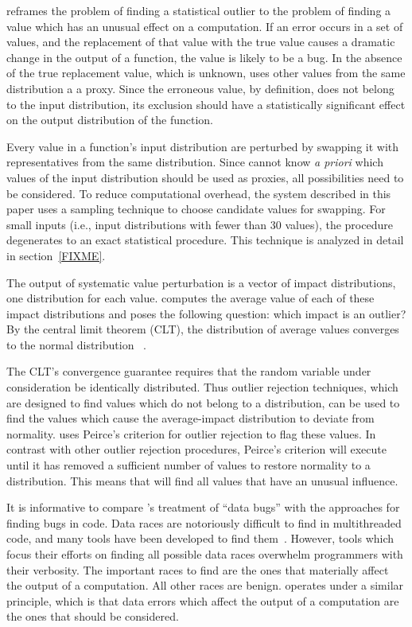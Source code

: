 \checkcell{} reframes the problem of finding a statistical outlier to the problem of finding a value which has an unusual effect on a computation.  If an error occurs in a set of values, and the replacement of that value with the true value causes a dramatic change in the output of a function, the value is likely to be a bug.  In the absence of the true replacement value, which is unknown, \checkcell{} uses other values from the same distribution a a proxy.  Since the erroneous value, by definition, does not belong to the input distribution, its exclusion should have a statistically significant effect on the output distribution of the function.

Every value in a function's input distribution are perturbed by swapping it with representatives from the same distribution.  Since \checkcell{} cannot know \emph{a priori} which values of the input distribution should be used as proxies, all possibilities need to be considered.  To reduce computational overhead, the system described in this paper uses a sampling technique to choose candidate values for swapping.  For small inputs (i.e., input distributions with fewer than 30 values), the procedure degenerates to an exact statistical procedure.  This technique is analyzed in detail in section~\ref{FIXME}.

The output of systematic value perturbation is a vector of impact distributions, one distribution for each value.  \checkcell{} computes the average value of each of these impact distributions and poses the following question: which impact is an outlier?  By the central limit theorem (CLT), the distribution of average values converges to the normal distribution ~\cite{FIXME}.

The CLT's convergence guarantee requires that the random variable under consideration be identically distributed.  Thus outlier rejection techniques, which are designed to find values which do not belong to a distribution, can be used to find the values which cause the average-impact distribution to deviate from normality.  \checkcell{} uses Peirce's criterion for outlier rejection to flag these values.  In contrast with other outlier rejection procedures, Peirce's criterion will execute until it has removed a sufficient number of values to restore normality to a distribution.  This means that \checkcell{} will find all values that have an unusual influence.

It is informative to compare \checkcell{}'s treatment of ``data bugs'' with the approaches for finding bugs in code.  Data races are notoriously difficult to find in multithreaded code, and many tools have been developed to find them~\cite{FIXME}.  However, tools which focus their efforts on finding all possible data races overwhelm programmers with their verbosity.  The important races to find are the ones that materially affect the output of a computation.  All other races are benign.  \checkcell{} operates under a similar principle, which is that data errors which affect the output of a computation are the ones that should be considered.
